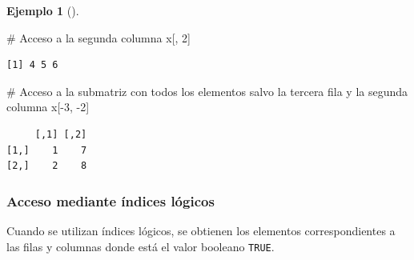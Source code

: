 \documentclass[
  a4paper,
]{scrreport}
\newenvironment{Shaded}{\begin{snugshade}}{\end{snugshade}}
\newcommand{\CommentTok}[1]{\textcolor[rgb]{0.37,0.37,0.37}{#1}}
\newcommand{\DecValTok}[1]{\textcolor[rgb]{0.68,0.00,0.00}{#1}}
\newcommand{\NormalTok}[1]{\textcolor[rgb]{0.00,0.23,0.31}{#1}}
\newcommand{\SpecialCharTok}[1]{\textcolor[rgb]{0.37,0.37,0.37}{#1}}
\theoremstyle{definition}
\theoremstyle{definition}
\newtheorem{example}{Ejemplo}[chapter]
\theoremstyle{remark}
\begin{document}
\begin{example}[]
\begin{Shaded}
\begin{Highlighting}[]
\CommentTok{\# Acceso a la segunda columna}
\NormalTok{x[, }\DecValTok{2}\NormalTok{]}
\end{Highlighting}
\end{Shaded}

\begin{verbatim}
[1] 4 5 6
\end{verbatim}

\begin{Shaded}
\begin{Highlighting}[]
\CommentTok{\# Acceso a la submatriz con todos los elementos salvo la tercera fila y la segunda columna}
\NormalTok{x[}\SpecialCharTok{{-}}\DecValTok{3}\NormalTok{, }\SpecialCharTok{{-}}\DecValTok{2}\NormalTok{]}
\end{Highlighting}
\end{Shaded}

\begin{verbatim}
     [,1] [,2]
[1,]    1    7
[2,]    2    8
\end{verbatim}

\end{example}

\subsubsection{Acceso mediante índices
lógicos}\label{acceso-mediante-uxedndices-luxf3gicos}

Cuando se utilizan índices lógicos, se obtienen los elementos
correspondientes a las filas y columnas donde está el valor booleano
\texttt{TRUE}.
\end{document}
